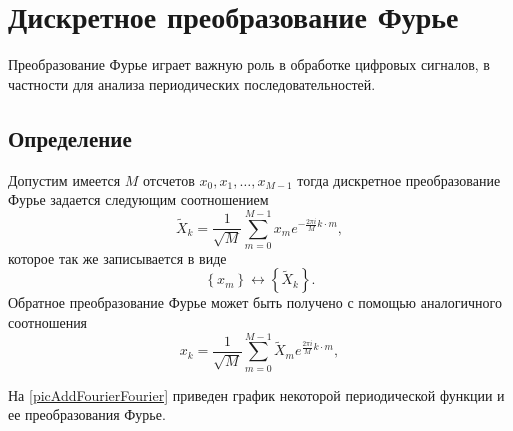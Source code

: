 \section{Дискретное преобразование Фурье}
\label{AddFourier}

Преобразование Фурье играет важную
роль в обработке цифровых сигналов, в частности для анализа
периодических последовательностей.
\subsection{Определение}
\begin{definition}
Допустим имеется $M$ отсчетов $x_0, x_1, \dots, x_{M-1}$ тогда
дискретное преобразование Фурье задается следующим соотношением
\begin{equation}
\tilde{X}_k = \frac{1}{\sqrt{M}}\sum^{M - 1}_{m = 0} x_m e^{-\frac{2 \pi i}{M} k\cdot m},
\label{eqAddFourierDiscretFourier}
\end{equation}
которое так же записывается в виде
\begin{equation}
\left\{x_m\right\} \longleftrightarrow \left\{\tilde{X}_k\right\}.
\nonumber
\end{equation}
Обратное преобразование Фурье может быть получено с помощью
аналогичного соотношения
\begin{equation}
x_k = \frac{1}{\sqrt{M}}\sum^{M - 1}_{m = 0} \tilde{X}_m e^{\frac{2 \pi i}{M} k\cdot m},
\nonumber
\end{equation}
\end{definition}

На \autoref{picAddFourierFourier} приведен график некоторой
периодической функции и ее преобразования Фурье. 



